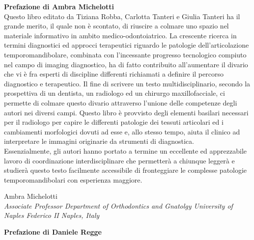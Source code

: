 \documentclass[10pt,twocolumn,a4paper]{article}
\begin{document}
	\newpage
	
	\textbf{\Large{Prefazione di Ambra Michelotti}}\\
	
	\vspace*{0.5cm}
	Questo libro editato da Tiziana Robba, Carlotta Tanteri e Giulia Tanteri ha il grande merito, il quale non è scontato, di riuscire a colmare uno spazio nel materiale informativo in ambito medico-odontoiatrico. La crescente ricerca in termini diagnostici ed approcci
	terapeutici riguardo le patologie dell'articolazione temporomandibolare, combinata con l'incessante progresso tecnologico compiuto nel campo di imaging diagnostico, ha di fatto contribuito all'aumentare il divario che vi è fra esperti di discipline differenti
	richiamati a definire il percorso diagnostico e terapeutico. Il fine di scrivere un testo multidisciplinario, secondo la prospettiva di un dentista, un radiologo ed un chirurgo maxillofacciale, ci permette di colmare questo divario attraverso l'unione delle
	competenze degli autori nei diversi campi. Questo libro è provvisto degli elementi basilari necessari per il radiologo per capire le differenti patologie dei tessuti articolari ed i cambiamenti morfologici dovuti ad esse e, allo stesso tempo, aiuta il clinico ad
	interpretare le immagini originarie da strumenti di diagnostica.\\
	Essenzialmente, gli autori hanno portato a termine un eccellente ed apprezzabile lavoro di coordinazione interdisciplinare che permetterà a chiunque leggerà e studierà questo testo facilmente accessibile di fronteggiare le complesse patologie
	temporomandibolari con esperienza maggiore.
	\begin{flushright}
		Ambra Michelotti\\
		\textit{\footnotesize{Associate Professor Department of Orthodontics and Gnatolgy University of Naples Federico II Naples, Italy}}
	\end{flushright}
	
	\newpage
	
	\textbf{\Large{Prefazione di Daniele Regge}}\\
	
\end{document}
